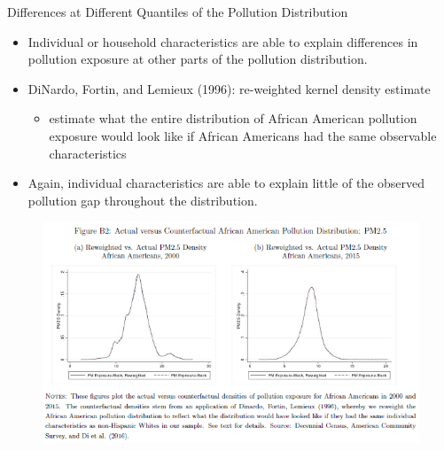 \documentclass[dvipdfmx,12pt]{beamer}
\begin{document}
\begin{frame}{Differences at Different Quantiles of the Pollution Distribution}
  \begin{itemize}
    \item Individual or household characteristics are able to explain differences in pollution exposure at other parts of the pollution distribution.
    \item DiNardo, Fortin, and Lemieux (1996): re-weighted kernel density estimate
    \begin{itemize}
      \item estimate what the entire distribution of African American pollution exposure would look like if African Americans had the same observable characteristics
    \end{itemize}
    \item Again, individual characteristics are able to explain little of the observed pollution gap throughout the distribution.
  \end{itemize}
\end{frame}

\begin{frame}{}
  \begin{figure}
    \centering
    \includegraphics[scale = .6]{FB2.png}
  \end{figure}
\end{frame}
\end{document}
